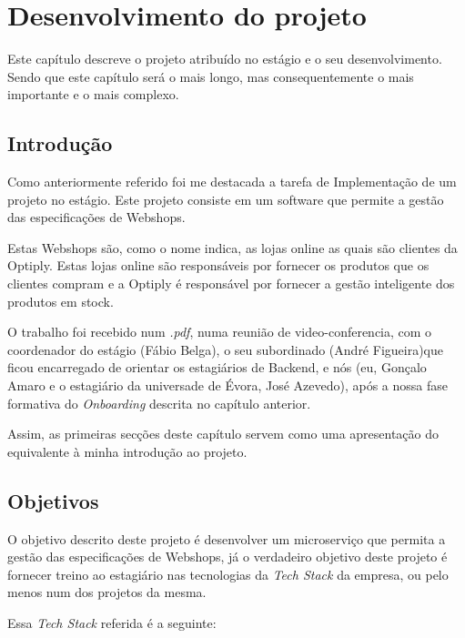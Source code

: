 \chapter{Desenvolvimento do projeto}
\label{cap4}

Este capítulo descreve o projeto atribuído no estágio e o seu desenvolvimento. Sendo que este capítulo será o mais longo, mas consequentemente o mais importante e o mais complexo.

\section{Introdução}

Como anteriormente referido foi me destacada a tarefa de Implementação de um projeto no estágio. Este projeto consiste em um software que permite a gestão das especificações de Webshops.

Estas Webshops são, como o nome indica, as lojas online as quais são clientes da Optiply. Estas lojas online são responsáveis por fornecer os produtos que os clientes compram e a Optiply é responsável por fornecer a gestão inteligente dos produtos em stock.

O trabalho foi recebido num \textit{.pdf}, numa reunião de video-conferencia, com o coordenador do estágio (Fábio Belga), o seu subordinado (André Figueira)que ficou encarregado de orientar os estagiários de Backend, e nós (eu, Gonçalo Amaro e o estagiário da universade de Évora, José Azevedo), após a nossa fase formativa do \textit{Onboarding} descrita no capítulo anterior.

Assim, as primeiras secções deste capítulo servem como uma apresentação do equivalente à minha introdução ao projeto.

\section{Objetivos}

O objetivo descrito deste projeto é desenvolver um microserviço que permita a gestão das especificações de Webshops, já o verdadeiro objetivo deste projeto é fornecer treino ao estagiário nas tecnologias da \textit{Tech Stack} da empresa, ou pelo menos num dos projetos da mesma.

\newpage

Essa \textit{Tech Stack} referida é a seguinte:

